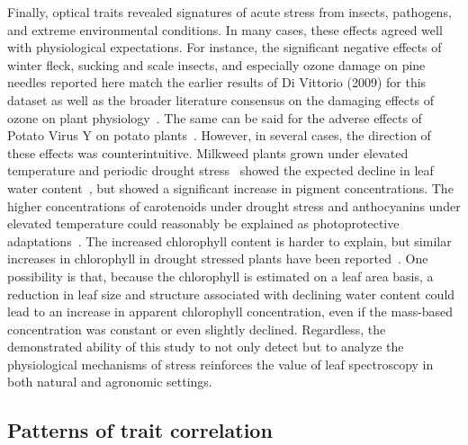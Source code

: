 Finally, optical traits revealed signatures of acute stress from insects, pathogens, and extreme environmental conditions.
In many cases, these effects agreed well with physiological expectations.
For instance, the significant negative effects of winter fleck, sucking and scale insects, and especially ozone damage on pine needles reported here match the earlier results of Di Vittorio (2009) for this dataset as well as the broader literature consensus on the damaging effects of ozone on plant physiology~\cite{lindroth_2010_impacts}. \nocite{divittorio_2009_pigment}
The same can be said for the adverse effects of Potato Virus Y on potato plants~\cite{scholthof_2011_top10}.
However, in several cases, the direction of these effects was counterintuitive.
Milkweed plants grown under elevated temperature and periodic drought stress~\cite{milkweed_data} showed the expected decline in leaf water content~\cite{penuelas_1994_reflectance,kramer_1995_water,cheng_2011_spectroscopic}, but showed a significant increase in pigment concentrations.
The higher concentrations of carotenoids under drought stress and anthocyanins under elevated temperature could reasonably be explained as photoprotective adaptations~\cite{young_1991_photoprotective,steyn_2002_anthocyanins,gould_2004_nature}.
The increased chlorophyll content is harder to explain, but similar increases in chlorophyll in drought stressed plants have been reported~\cite{vilfan_2016_fluspect}.
One possibility is that, because the chlorophyll is estimated on a leaf area basis, a reduction in leaf size and structure associated with declining water content could lead to an increase in apparent chlorophyll concentration, even if the mass-based concentration was constant or even slightly declined.
Regardless, the demonstrated ability of this study to not only detect but to analyze the physiological mechanisms of stress reinforces the value of leaf spectroscopy in both natural and agronomic settings.

\subsection{Patterns of trait correlation}

